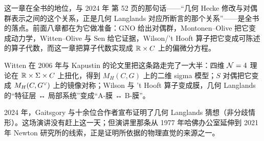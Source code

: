 \begin{pizhu}{这一章在全书的地位，与 2024 年}
第 52 页的那句话——“几何 Hecke 修改与对偶群表示之间的这个关系，正是几何 Langlands 对应所断言的那个关系”——是全书的落点。前面八章都在为它做准备：GNO 给出对偶群，Montonen--Olive 把它变成动力学，Witten--Olive 与 Sen 给它证据，Wilson/'t Hooft 算子把它变成可陈述的算子代数，而这一章把算子代数实现成 $\mathbb{R}\times C$ 上的偏微分方程。

Witten 在 2006 年与 Kapustin 的论文里把这条路走完了一大半：四维 $\mathcal{N}=4$ 理论在 $\mathbb{R}\times\Sigma\times C$ 上扭化，得到 $M_H(C,G)$ 上的二维 sigma 模型；$S$ 对偶把它变成 $M_H(C,G^{\vee})$ 上的镜像对称；Wilson 与 't Hooft 算子变成膜，几何 Langlands 的“特征层 ↔ 局部系统”变成“A-膜 ↔ B-膜”。

2024 年，Gaitsgory 与十余位合作者宣布证明了几何 Langlands 猜想（非分歧情形）。这场演讲没有赶上这一天；但演讲里那条从 1977 年哈佛办公室延伸到 2021 年 Newton 研究所的线索，正是证明所依据的物理直觉的来源之一。
\end{pizhu}
